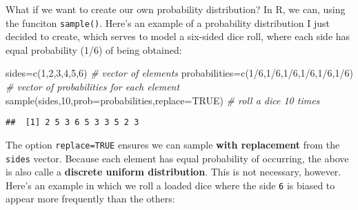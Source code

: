 \documentclass[
]{book}
\newenvironment{Shaded}{\begin{snugshade}}{\end{snugshade}}
\newcommand{\AttributeTok}[1]{\textcolor[rgb]{0.77,0.63,0.00}{#1}}
\newcommand{\CommentTok}[1]{\textcolor[rgb]{0.56,0.35,0.01}{\textit{#1}}}
\newcommand{\ConstantTok}[1]{\textcolor[rgb]{0.00,0.00,0.00}{#1}}
\newcommand{\DecValTok}[1]{\textcolor[rgb]{0.00,0.00,0.81}{#1}}
\newcommand{\FunctionTok}[1]{\textcolor[rgb]{0.00,0.00,0.00}{#1}}
\newcommand{\NormalTok}[1]{#1}
\newcommand{\OtherTok}[1]{\textcolor[rgb]{0.56,0.35,0.01}{#1}}
\newcommand{\SpecialCharTok}[1]{\textcolor[rgb]{0.00,0.00,0.00}{#1}}
\begin{document}
What if we want to create our own probability distribution? In R, we can, using the funciton \texttt{sample()}. Here's an example of a probability distribution I just decided to create, which serves to model a six-sided dice roll, where each side has equal probability (1/6) of being obtained:

\begin{Shaded}
\begin{Highlighting}[]
\NormalTok{sides}\OtherTok{=}\FunctionTok{c}\NormalTok{(}\DecValTok{1}\NormalTok{,}\DecValTok{2}\NormalTok{,}\DecValTok{3}\NormalTok{,}\DecValTok{4}\NormalTok{,}\DecValTok{5}\NormalTok{,}\DecValTok{6}\NormalTok{) }\CommentTok{\# vector of elements}
\NormalTok{probabilities}\OtherTok{=}\FunctionTok{c}\NormalTok{(}\DecValTok{1}\SpecialCharTok{/}\DecValTok{6}\NormalTok{,}\DecValTok{1}\SpecialCharTok{/}\DecValTok{6}\NormalTok{,}\DecValTok{1}\SpecialCharTok{/}\DecValTok{6}\NormalTok{,}\DecValTok{1}\SpecialCharTok{/}\DecValTok{6}\NormalTok{,}\DecValTok{1}\SpecialCharTok{/}\DecValTok{6}\NormalTok{,}\DecValTok{1}\SpecialCharTok{/}\DecValTok{6}\NormalTok{) }\CommentTok{\# vector of probabilities for each element}
\FunctionTok{sample}\NormalTok{(sides,}\DecValTok{10}\NormalTok{,}\AttributeTok{prob=}\NormalTok{probabilities,}\AttributeTok{replace=}\ConstantTok{TRUE}\NormalTok{) }\CommentTok{\# roll a dice 10 times}
\end{Highlighting}
\end{Shaded}

\begin{verbatim}
##  [1] 2 5 3 6 5 3 3 5 2 3
\end{verbatim}

The option \texttt{replace=TRUE} ensures we can sample \textbf{with replacement} from the \texttt{sides} vector. Because each element has equal probability of occurring, the above is also calle a \textbf{discrete uniform distribution}. This is not necessary, however. Here's an example in which we roll a loaded dice where the side \texttt{6} is biased to appear more frequently than the others:
\end{document}
